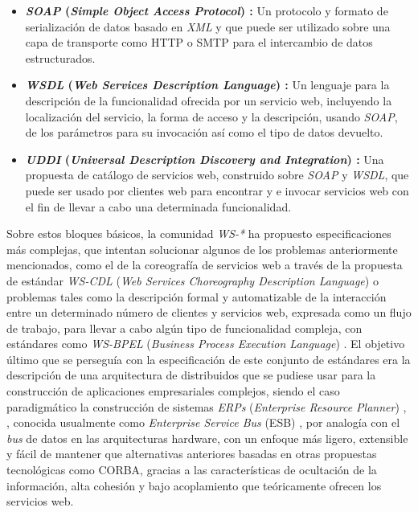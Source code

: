 \begin{itemize}
\item \textbf{\textit{SOAP} (\textit{Simple Object Access Protocol}) \cite{soap}:} Un protocolo y formato de serializaci\'on de datos basado en \textit{XML} y que puede ser utilizado sobre una capa de transporte como HTTP o SMTP para el intercambio de datos estructurados.

\item \textbf{\textit{WSDL} (\textit{Web Services Description Language}) \cite{wsdl}:} Un lenguaje para la descripci\'on de la funcionalidad ofrecida por un servicio web, incluyendo la localizaci\'on del servicio, la forma de acceso y la descripci\'on, usando \textit{SOAP}, de los par\'ametros para su invocaci\'on as\'i como el tipo de datos devuelto.

\item \textbf{\textit{UDDI} (\textit{Universal Description Discovery and Integration}) \cite{uddi}:} Una propuesta de cat\'alogo de servicios web, construido sobre \textit{SOAP} y \textit{WSDL}, que puede ser usado por clientes web para encontrar y e invocar servicios web con el fin de llevar a cabo una determinada funcionalidad.
\end{itemize}


Sobre estos bloques b\'asicos, la comunidad \textit{WS-*} ha propuesto especificaciones m\'as complejas, que intentan solucionar algunos de los problemas anteriormente mencionados, como el de la coreograf\'ia de servicios web a trav\'es de la propuesta de est\'andar \textit{WS-CDL} (\textit{Web Services Choreography Description Language}) \cite{wscdl} o problemas tales como la descripci\'on formal y automatizable de la interacci\'on entre un determinado n\'umero de clientes y servicios web, expresada como un flujo de trabajo, para llevar a cabo alg\'un tipo de funcionalidad compleja, con est\'andares como \textit{WS-BPEL} (\textit{Business Process Execution Language}) \cite{wsbpel}. El objetivo \'ultimo que se persegu\'ia con la especificaci\'on de este conjunto de est\'andares era la descripci\'on de una arquitectura de distribuidos que se pudiese usar para la construcci\'on de aplicaciones empresariales complejos, siendo el caso paradigm\'atico la construcci\'on de sistemas \textit{ERPs} (\textit{Enterprise Resource Planner}) \cite{jian2008design}, \cite{li2009research}, conocida usualmente como \textit{Enterprise Service Bus} (ESB) \cite{esb}, por analog\'ia con el \textit{bus} de datos en las arquitecturas hardware, con un enfoque m\'as ligero, extensible y f\'acil de mantener que alternativas anteriores basadas en otras propuestas tecnol\'ogicas como CORBA, gracias a las caracter\'isticas de ocultaci\'on de la informaci\'on, alta cohesi\'on y bajo acoplamiento que te\'oricamente ofrecen los servicios web.\\

